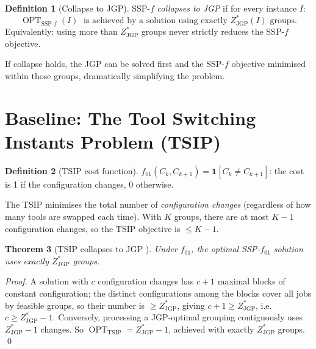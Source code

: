 \documentclass[11pt,a4paper]{article}
\theoremstyle{plain}
\newtheorem{theorem}{Theorem}[section]
\theoremstyle{definition}
\newtheorem{definition}[theorem]{Definition}
\DeclareMathOperator{\OPT}{OPT}
\newcommand{\ZJGP}{Z_{\mathrm{JGP}}^*}
\begin{document}
\begin{definition}[Collapse to JGP]
\label{def:collapse}
SSP-$f$ \emph{collapses to JGP} if for every instance $I$:
\[
  \OPT_{\mathrm{SSP}\text{-}f}(I)
  \;\text{ is achieved by a solution using exactly } \ZJGP(I) \text{ groups.}
\]
Equivalently: using more than $\ZJGP$ groups never strictly reduces the
SSP-$f$ objective.
\end{definition}

\noindent If collapse holds, the JGP can be solved first and the SSP-$f$ objective
minimised within those groups, dramatically simplifying the problem.

\section{Baseline: The Tool Switching Instants Problem (TSIP)}
\label{sec:tsip}

\begin{definition}[TSIP cost function]
$f_{01}(C_k, C_{k+1}) = \mathbf{1}[C_k \ne C_{k+1}]$: the cost is 1 if the
configuration changes, 0 otherwise.
\end{definition}

The TSIP minimises the total number of \emph{configuration changes} (regardless
of how many tools are swapped each time). With $K$ groups, there are at most
$K-1$ configuration changes, so the TSIP objective is $\le K-1$.

\begin{thmbox}
\begin{theorem}[TSIP collapses to JGP \cite{Adjiashvili2015}]
\label{thm:tsip}
Under $f_{01}$, the optimal SSP-$f_{01}$ solution uses exactly $\ZJGP$ groups.
\end{theorem}
\end{thmbox}

\begin{proofbox}
\begin{proof}
A solution with $c$ configuration changes has $c+1$ maximal blocks of constant
configuration; the distinct configurations among the blocks cover all jobs by feasible
groups, so their number is $\ge\ZJGP$, giving $c+1\ge\ZJGP$, i.e.\ $c\ge\ZJGP-1$.
Conversely, processing a JGP-optimal grouping contiguously uses $\ZJGP-1$ changes.
So $\OPT_{\mathrm{TSIP}} = \ZJGP - 1$, achieved with exactly $\ZJGP$ groups. \qed
\end{proof}
\end{proofbox}
\end{document}
